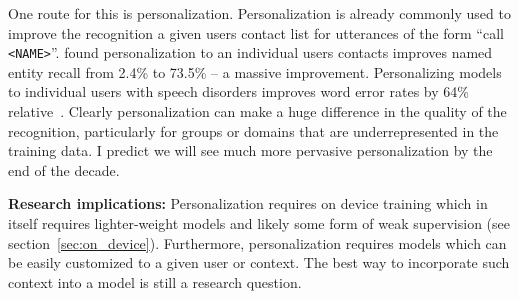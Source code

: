 One route for this is personalization. Personalization is already commonly used
to improve the recognition a given users contact list for utterances of the
form ``call \texttt{<NAME>}''. \citet{sim2019personalization} found
personalization to an individual users contacts improves named entity recall
from 2.4\% to 73.5\% -- a massive improvement. Personalizing models to
individual users with speech disorders improves word error rates by 64\%
relative~\citep{sim2019investigation}. Clearly personalization can make a huge
difference in the quality of the recognition, particularly for groups or
domains that are underrepresented in the training data. I predict we will see
much more pervasive personalization by the end of the decade.

{\bf Research implications:} Personalization requires on device training which
in itself requires lighter-weight models and likely some form of weak
supervision (see section~\ref{sec:on_device}). Furthermore, personalization
requires models which can be easily customized to a given user or context.
The best way to incorporate such context into a model is still a research
question.
